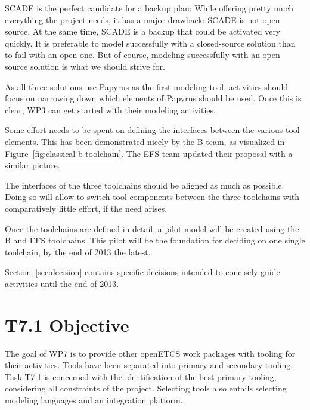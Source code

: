 SCADE is the perfect candidate for a backup plan: While offering pretty much everything the project needs, it has a major drawback: SCADE is not open source.  At the same time, SCADE is a backup that could be activated very quickly.  It is preferable to model successfully with a closed-source solution than to fail with an open one.  But of course, modeling successfully with an open source solution is what we should strive for.

As all three solutions use Papyrus as the first modeling tool, activities should focus on narrowing down which elements of Papyrus should be used.  Once this is clear, WP3 can get started with their modeling activities.

Some effort needs to be spent on defining the interfaces between the various tool elements.  This has been demonstrated nicely by the B-team, as visualized in Figure~\ref{fig:classical-b-toolchain}.  The EFS-team updated their proposal with a similar picture.

The interfaces of the three toolchains should be aligned as much as possible.  Doing so will allow to switch tool components between the three toolchains with comparatively little effort, if the need arises.

Once the toolchains are defined in detail, a pilot model will be created using the B and EFS toolchains.  This pilot will be the foundation for deciding on one single toolchain, by the end of 2013 the latest.

Section~\ref{sec:decision} contains specific decisions intended to concisely guide activities until the end of 2013.

\section{T7.1 Objective}

The goal of WP7 is to provide other openETCS work packages with tooling for their activities.  Tools have been separated into primary and secondary tooling.  Task T7.1 is concerned with the identification of the best primary tooling, considering all constraints of the project.  Selecting tools also entails selecting modeling languages and an integration platform.

